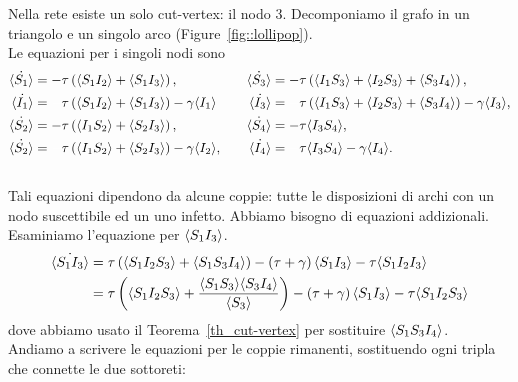 Nella rete esiste un solo cut-vertex: il nodo $3$. Decomponiamo il grafo in un triangolo e un singolo arco (Figure~\ref{fig::lollipop}).\\
Le equazioni per i singoli nodi sono 
 \begin{equation*}
 \begin{aligned}
 \dot{\angol{S_1}}&= -\tau \tonde{ \angol{ S_1 I_2} + \angol{S_1 I_3}},  \quad 
 &\dot{\angol{S_3}}&= -\tau \tonde{ \angol{I_1 S_3} + \angol{I_2 S_3}+ \angol{S_3 I_4}},  \\
 \dot{\angol{I_1}}&= \spa \tau \tonde{ \angol{ S_1 I_2} + \angol{S_1 I_3}} - \gamma\angol{I_1} \quad 
 &\dot{\angol{I_3}}&= \spa \tau \tonde{ \angol{I_1 S_3} + \angol{I_2 S_3}+ \angol{S_3 I_4}}-\gamma\angol{I_3},\\
 \dot{\angol{S_2}}&= -\tau \tonde{ \angol{ I_1 S_2} + \angol{S_2 I_3}}, \quad &\dot{\angol{S_4}} &= -\tau \angol{I_3S_4},  \\
 \dot{\angol{S_2}}&= \spa \tau \tonde{ \angol{ I_1 S_2} + \angol{S_2 I_3}} - \gamma\angol{I_2},\quad & \dot{\angol{I_4}}&=\spa \tau\angol{I_3S_4}-\gamma\angol{I_4}. \\\
 \end{aligned}	
 \end{equation*}
 Tali equazioni dipendono da alcune coppie: tutte le disposizioni di archi con un nodo suscettibile ed un uno infetto. Abbiamo bisogno di equazioni addizionali.\\
 Esaminiamo l'equazione per $\langle S_1 I_3 \rangle$. 
 \begin{equation*}
 \begin{aligned}	
 \dot{\langle S_1I_3 \rangle}&= \tau\left(  \langle S_1I_2S_3 \rangle + \langle S_1S_3I_4 \rangle \right) - \left(  \tau +\gamma \right)\langle S_1 I_3 \rangle -\tau \langle  S_1 I_2 I_3 \rangle \\
 &= \tau \left(  \langle S_1I_2S_3 \rangle + \frac{ \langle S_1S_3 \rangle\langle S_3 I_4 \rangle}{\langle S_3 \rangle} \right) -\left(  \tau + \gamma \right) \langle S_1I_3 \rangle - \tau \langle S_1I_2S_3 \rangle
 \end{aligned}
 \end{equation*}
 dove abbiamo usato il Teorema~\ref{th_cut-vertex} per sostituire $\langle S_1S_3I_4 \rangle$.\\
 Andiamo a scrivere le equazioni per le coppie rimanenti, sostituendo ogni tripla che connette le due sottoreti:
